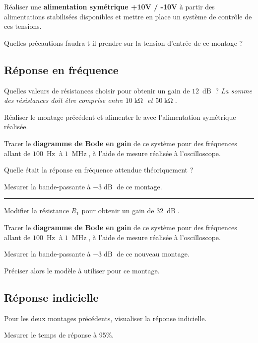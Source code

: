 \Manip Réaliser une \textbf{alimentation symétrique +10V / -10V} à partir des alimentations stabilisées disponibles et mettre en place un système de contrôle de ces tensions.

\Quest Quelles précautions faudra-t-il prendre sur la tension d'entrée de ce montage ?

\subsection{Réponse en fréquence}

\Quest Quelles valeurs de résistances choisir pour obtenir un gain de $12~\operatorname{dB}$ ? \textit{La somme des résistances doit être comprise entre $10\operatorname{k\Omega}$ et $50\operatorname{k\Omega}$.}

\Manip Réaliser le montage précédent et alimenter le avec l'alimentation symétrique réalisée.

\Manip Tracer le \textbf{diagramme de Bode en gain} de ce système pour des fréquences allant de $100~\operatorname{Hz}$ à $1~\operatorname{MHz}$, à l'aide de mesure réalisée à l'oscilloscope. 

\Quest Quelle était la réponse en fréquence attendue théoriquement ? 

\Manip Mesurer la bande-passante à $-3\operatorname{dB}$ de ce montage.

\noindent \rule{\linewidth}{1pt}

\Manip Modifier la résistance $R_1$ pour obtenir un gain de $32~\operatorname{dB}$.

\Manip Tracer le \textbf{diagramme de Bode en gain} de ce système pour des fréquences allant de $100~\operatorname{Hz}$ à $1~\operatorname{MHz}$, à l'aide de mesure réalisée à l'oscilloscope. 

\Manip Mesurer la bande-passante à $-3\operatorname{dB}$ de ce nouveau montage.

\Quest Préciser alors le modèle à utiliser pour ce montage. 


\subsection{Réponse indicielle}

\Manip Pour les deux montages précédents, visualiser la réponse indicielle.

\Manip Mesurer le temps de réponse à 95\%.


